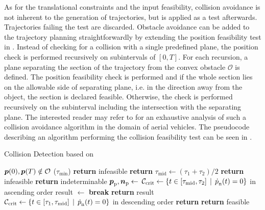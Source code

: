 As for the translational constraints and the input feasibility, collision avoidance is not inherent to the generation of trajectories, but is applied as a test afterwards. Trajectories failing the test are discarded.
Obstacle avoidance can be added to the trajectory planning straightforwardly by extending the position feasibility test in .
Instead of checking for a collision with a single predefined plane, the position check is performed recursively on subintervals of $\left[0, T\right]$.
For each recursion, a plane separating the section of the trajectory from the convex obstacle $\mathcal{O}$ is defined.
The position feasibility check is performed and if the whole section lies on the allowable side of separating plane, i.e. in the direction away from the object, the section is declared feasible.
Otherwise, the check is performed recursively on the subinterval including the intersection with the separating plane.
The interested reader may refer to \cite{Bucki19} for an exhaustive analysis of such a collision avoidance algorithm in the domain of aerial vehicles.
The pseudocode describing an algorithm performing the collision feasibility test can be seen in .
\begin{algorithm}
    \caption{Collision Detection based on \cite{Bucki19}}
    \label{alg:collision-detection}
	\begin{algorithmic}[1]
		\Require $\mbox{$\bm{p}$}(0),\mbox{$\bm{p}$}(T) \notin \mathcal{O}$
		($\tau_{\min}$)
				\State \textbf{return} infeasible
			\EndIf
			\State \textbf{return}
		\EndFunction
		\State $\tau_{\text{mid}} \gets (\tau_1 + \tau_2) / 2$
			\State \textbf{return} infeasible
			\State \textbf{return} indeterminable
		\EndIf
		\State $\mbox{$\bm{p}$}_{\text{p}}, \mbox{$\bm{n}$}_{\text{p}} \gets$
		\State $\mathcal{C}_{\text{crit}} \gets
		\left\{
			t \in \left[ \tau_{\text{mid}}, \tau_2 \right]
			\,\mid\, \mbox{$\dot{p}$}_{\text{n}}(t) = 0
		\right\}$ in ascending order
				\State result $\gets$ 
					\State \textbf{break}
				\Else
					\State \textbf{return} result
				\EndIf
			\EndIf
		\EndFor
		\State $\mathcal{C}_{\text{crit}} \gets
		\left\{
			t \in \left[ \tau_1, \tau_{\text{mid}}\right]
			\,\mid\, \mbox{$\dot{p}$}_{\text{n}}(t) = 0
		\right\}$ in descending order
				\State \textbf{return} 
			\EndIf
		\EndFor
		\State \textbf{return} feasible
		\EndFunction
	\end{algorithmic}
\end{algorithm}

